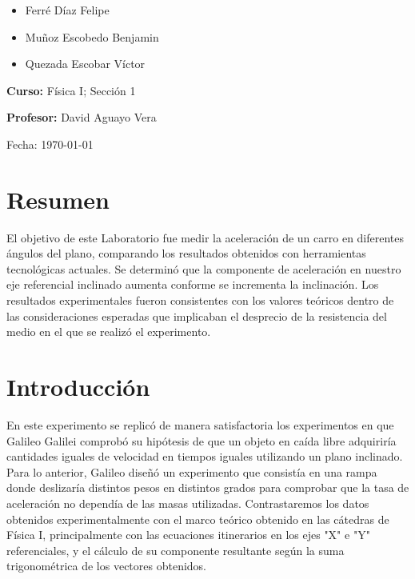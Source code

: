 \documentclass[twocolumn,12pt]{article}
\begin{document}
\begin{titlepage}
\begin{flushleft}
			\begin{itemize}
				\item Ferré Díaz Felipe
				\item Muñoz Escobedo Benjamin 
                \item Quezada Escobar Víctor
			\end{itemize}
			
			\vspace{0.2in}
			
			\large
			\textbf{Curso:} Física I; Sección 1
			
			\vspace{0.2in}
			
			\large
			\textbf{Profesor:} David Aguayo Vera
		\end{flushleft}
		
		\vspace{0.2in}
		
		\begin{flushright}
			\Large
			Fecha: \today %
		\end{flushright}
		
		
		
		\vspace{1in}
	\end{titlepage}
	
	\section{Resumen}
 El objetivo de este Laboratorio fue medir la aceleración de un carro en diferentes ángulos del plano, comparando los resultados obtenidos con herramientas tecnológicas actuales. Se determinó que la componente de aceleración en nuestro eje referencial inclinado aumenta conforme se incrementa la inclinación. Los resultados experimentales fueron consistentes con los valores teóricos dentro de las consideraciones esperadas que implicaban el desprecio de la resistencia del medio en el que se realizó el experimento.
	
	\section{Introducción}
En este experimento se replicó de manera satisfactoria los experimentos en que Galileo Galilei comprobó su hipótesis de que un objeto en caída libre adquiriría cantidades iguales de velocidad en tiempos iguales utilizando un plano inclinado. Para lo anterior, Galileo diseñó un experimento que consistía en una rampa donde deslizaría distintos pesos en distintos grados para comprobar que la tasa de aceleración no dependía de las masas utilizadas. Contrastaremos los datos obtenidos experimentalmente con el marco teórico obtenido en las cátedras de Física I, principalmente con las ecuaciones itinerarios en los ejes "X" e "Y" referenciales, y el cálculo de su componente resultante según la suma trigonométrica de los vectores obtenidos.
		
\end{document}
